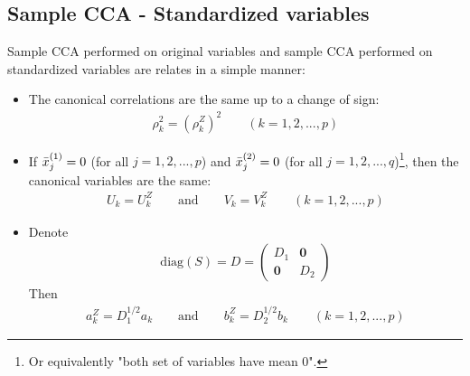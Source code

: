 \documentclass[12pt]{extarticle}
\newcommand{\<}{\langle}
\renewcommand{\>}{\rangle}
\theoremstyle{definition}
\begin{document}
\subsection{Sample CCA - Standardized variables}
Sample CCA performed on original variables and sample CCA performed on standardized variables are relates in a simple manner:
\begin{tcolorbox}[enhanced, drop fuzzy shadow, title=Result 10.3]
\begin{itemize}
    \item The canonical correlations are the same up to a change of sign:
    \begin{align*}
        \rho^2_k = (\rho^Z_k)^2 \qquad (k=1,2,...,p)
    \end{align*}
    \item If $\Bar{x}_j^{(1)}=0$ (for all $j=1,2,...,p$) and $\Bar{x}_j^{(2)}=0$ (for all $j=1,2,...,q$)\footnote{Or equivalently "both set of variables have mean 0".}, then the canonical variables are the same:
    \begin{align*}
        U_k =U_k^Z \qquad \text{and} \qquad V_k = V_k^Z \qquad (k=1,2,...,p)
    \end{align*}
    \item Denote
    \begin{align*}
        \text{diag}(S)=D= \left(\begin{array}{cc}
        D_1 & \textbf{0} \\
        \textbf{0} & D_2
        \end{array} \right)
    \end{align*}
    Then
    \begin{align*}
        a_k^Z = D_1^{1/2}a_k \qquad \text{and} \qquad b_k^Z = D_2^{1/2}b_k \qquad (k=1,2,...,p)
    \end{align*}
\end{itemize}
\end{tcolorbox}
\end{document}
